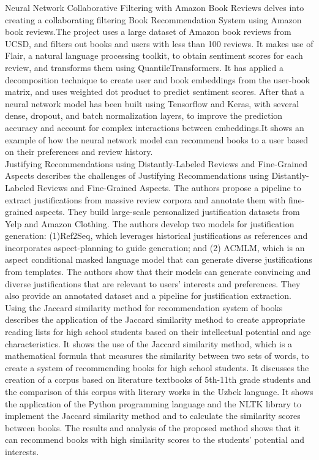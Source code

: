Neural Network Collaborative Filtering with Amazon Book Reviews\cite{NN1} delves into creating a collaborating filtering Book Recommendation System using Amazon book reviews.The project uses a large dataset of Amazon book reviews from UCSD, and filters out books and users with less than 100 reviews. It makes use of Flair, a natural language processing toolkit, to obtain sentiment scores for each review, and transforms them using QuantileTransformers. It has applied a decomposition technique to create user and book embeddings from the user-book matrix, and uses weighted dot product to predict sentiment scores. After that a neural network model has been built using Tensorflow and Keras, with several dense, dropout, and batch normalization layers, to improve the prediction accuracy and account for complex interactions between embeddings.It shows an example of how the neural network model can recommend books to a user based on their preferences and review history.\\
Justifying Recommendations using Distantly-Labeled Reviews and
Fine-Grained Aspects \cite{NN2} describes the challenges of Justifying Recommendations using Distantly-Labeled Reviews and
Fine-Grained Aspects. The authors propose a pipeline to extract justifications from massive review corpora and annotate them with fine-grained aspects. They build large-scale personalized justification datasets from Yelp and Amazon Clothing. The authors develop two models for justification generation: (1)Ref2Seq, which leverages historical justifications as references and incorporates aspect-planning to guide generation; and (2) ACMLM, which is an aspect conditional masked language model that can generate diverse justifications from templates. The authors show that their models can generate convincing and diverse justifications that are relevant to users’ interests and preferences. They also provide an annotated dataset and a pipeline for justification extraction.\\
Using the Jaccard similarity method for recommendation system of books \cite{JS2} describes the application of the Jaccard similarity method to create appropriate reading lists for high school students based on their intellectual potential and age characteristics. It shows the use of the Jaccard similarity method, which is a mathematical formula that measures the similarity between two sets of words, to create a system of recommending books for high school students. It discusses the creation of a corpus based on literature textbooks of 5th-11th grade students and the comparison of this corpus with literary works in the Uzbek language. It shows the application of the Python programming language and the NLTK library to implement the Jaccard similarity method and to calculate the similarity scores between books. The results and analysis of the proposed method shows that it can recommend books with high similarity scores to the students’ potential and interests.\\
